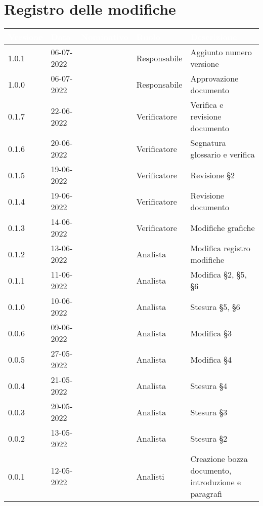 \section*{Registro delle modifiche}
{


\newlength{\freewidth}
\setlength{\freewidth}{\dimexpr\textwidth-10\tabcolsep}
\renewcommand{\arraystretch}{1.5}
\centering
\setlength{\aboverulesep}{0pt}
\setlength{\belowrulesep}{0pt}
\begin{longtable}{C{.13\freewidth} C{.15\freewidth} C{.26\freewidth} C{.18\freewidth} C{.282379\freewidth}}
	\toprule
{}
\textcolor{white}{\textbf{Versione}}&
\textcolor{white}{\textbf{Data}}&
\textcolor{white}{\textbf{Nominativo}}&
\textcolor{white}{\textbf{Ruolo}}&
\textcolor{white}{\textbf{Descrizione}}\\	
\toprule
\endhead

1.0.1 & 06-07-2022 & \marcov{} & Responsabile & Aggiunto numero versione \\
1.0.0 & 06-07-2022 & \giulio{} & Responsabile & Approvazione documento \\
0.1.7 & 22-06-2022 & \matteo{} & Verificatore & Verifica e revisione documento \\
0.1.6 & 20-06-2022 & \marcob{} & Verificatore & Segnatura glossario e verifica \\
0.1.5 & 19-06-2022 & \matteo{} & Verificatore & Revisione \S 2 \\
0.1.4 & 19-06-2022 & \matteo{} & Verificatore & Revisione documento \\
0.1.3 & 14-06-2022 & \matteo{} & Verificatore & Modifiche grafiche \\
0.1.2 & 13-06-2022 & \marcob{} & Analista & Modifica registro modifiche \\
0.1.1 & 11-06-2022 & \angela{} & Analista & Modifica \S 2, \S 5, \S 6 \\
0.1.0 & 10-06-2022 & \angela{} & Analista & Stesura \S 5, \S 6 \\
0.0.6 & 09-06-2022 & \marcob{} & Analista & Modifica \S 3 \\
0.0.5 & 27-05-2022 & \angela{} & Analista & Modifica \S 4 \\
0.0.4 & 21-05-2022 & \angela{} & Analista & Stesura \S 4 \\
0.0.3 & 20-05-2022 & \marcob{} & Analista & Stesura \S 3 \\		
0.0.2 & 13-05-2022 & \angela{} & Analista & Stesura \S 2 \\
0.0.1 & 12-05-2022 & \teamname{} & Analisti & Creazione bozza documento, introduzione e paragrafi \\	
\bottomrule
\end{longtable}
}
